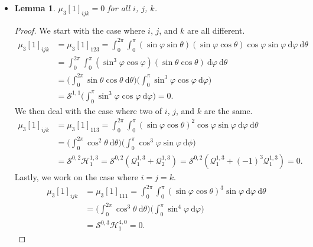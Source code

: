 \documentclass[10pt]{article}
\newtheorem{lemma}{Lemma}[section]
\newcommand{\dee}{\mathrm{d}}
\begin{document}
\begin{itemize}
      \item \begin{lemma}
        $\mu_3[1]_{ijk} = 0$ for all $i$, $j$, $k$.
      \end{lemma}
      \begin{proof}
        We start with the case where $i$, $j$, and $k$ are all different.
        \begin{align*}
          \mu_3[1]_{ijk} &= \mu_3[1]_{123} = \int_{0}^{2\pi} \int_0^\pi (\sin \varphi \sin \theta) (\sin \varphi \cos \theta) \cos \varphi \sin \varphi \ \dee \varphi\ \dee \theta\\
          &= \int_{0}^{2\pi} \int_0^\pi (\sin^3 \varphi \cos \varphi) (\sin \theta \cos \theta)\ \dee \varphi\ \dee \theta\\
          &= \bigg( \int_{0}^{2\pi} \sin \theta \cos \theta\ \dee \theta \bigg) \bigg( \int_0^\pi \sin^3 \varphi \cos \varphi\ \dee \varphi \bigg)\\
          &= \mathcal{S}^{1,1} \bigg( \int_0^\pi \sin^3 \varphi \cos \varphi\ \dee \varphi \bigg) = 0.
        \end{align*}
        We then deal with the case where two of $i$, $j$, and $k$ are the same.
        \begin{align*}
          \mu_3[1]_{ijk}
          &= \mu_3[1]_{113}
          = \int_{0}^{2\pi} \int_0^\pi (\sin \varphi \cos \theta)^2 \cos \varphi \sin \varphi \ \dee \varphi\ \dee \theta\\
          &= \bigg( \int_{0}^{2\pi} \cos^2 \theta\ \dee \theta \bigg) \bigg( \int_0^\pi \cos^3 \varphi \sin \varphi\ \dee \phi \bigg)\\
          &= \mathcal{S}^{0,2} \mathcal{H}_1^{1,3}
          = \mathcal{S}^{0,2} ( \mathcal{Q}_1^{1,3} + \mathcal{Q}_2^{1,3})
          = \mathcal{S}^{0,2} ( \mathcal{Q}_1^{1,3} + (-1)^3\mathcal{Q}_1^{1,3})
          = 0.
        \end{align*}
        Lastly, we work on the case  where $i = j = k$.
        \begin{align*}
          \mu_{3}[1]_{ijk}
          &= \mu_{3}[1]_{111}
          = \int_{0}^{2\pi} \int_0^\pi (\sin \varphi \cos \theta)^3 \sin \varphi \ \dee \varphi\ \dee \theta\\
          &= \bigg( \int_{0}^{2\pi} \cos^3 \theta\ \dee \theta \bigg) \bigg( \int_{0}^\pi \sin^4 \varphi \ \dee \varphi \bigg)\\
          &= \mathcal{S}^{0,3} \mathcal{H}_1^{4,0} = 0.
        \end{align*}
      \end{proof}
      

\end{itemize}
\end{document}
